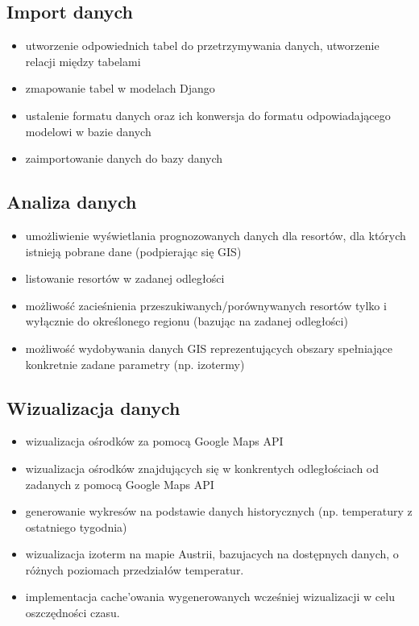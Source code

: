 \documentclass[12pt]{article}
\begin{document}
\subsection{Import danych}
\begin{itemize}
  \item utworzenie odpowiednich tabel do przetrzymywania danych, utworzenie relacji między tabelami
  \item zmapowanie tabel w modelach Django
  \item ustalenie formatu danych oraz ich konwersja do formatu odpowiadającego modelowi w bazie danych
  \item zaimportowanie danych do bazy danych
\end{itemize}

\subsection{Analiza danych}
\begin{itemize}
  \item umożliwienie wyświetlania prognozowanych danych dla resortów, dla których istnieją pobrane dane
        (podpierając się GIS)
  \item listowanie resortów w zadanej odległości
  \item możliwość zacieśnienia przeszukiwanych/porównywanych resortów tylko i wyłącznie do określonego regionu (bazując na zadanej odległości)
  \item możliwość wydobywania danych GIS reprezentujących obszary spełniające konkretnie zadane parametry (np. izotermy)
\end{itemize}

\subsection{Wizualizacja danych}
\begin{itemize}
  \item wizualizacja ośrodków za pomocą Google Maps API
  \item wizualizacja ośrodków znajdujących się w konkrentych odległościach od zadanych z pomocą Google Maps API
  \item generowanie wykresów na podstawie danych historycznych (np. temperatury z ostatniego tygodnia)
  \item wizualizacja izoterm na mapie Austrii, bazujacych na dostępnych danych, o różnych poziomach przedziałów temperatur.
  \item implementacja cache'owania wygenerowanych wcześniej wizualizacji w celu oszczędności czasu.
\end{itemize}
\end{document}
